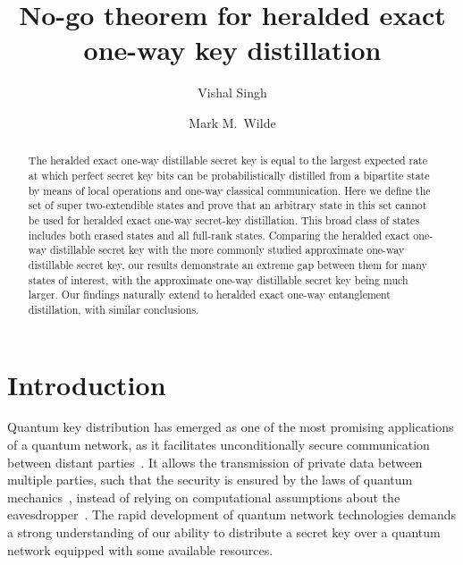 \documentclass[twocolumn,letterpaper, dvipsnames,allowtoday, accepted = 2025-12-31]{quantumarticle}
\begin{document}
\title[ ]{No-go theorem for heralded exact one-way  key distillation}

\author{Vishal Singh}
\author{Mark M.~Wilde}


\begin{abstract}
    The heralded exact one-way distillable secret key is equal to the largest expected rate at which perfect secret key bits can be probabilistically distilled from a bipartite state by means of local operations and one-way classical communication. Here we define the set of super two-extendible states and prove that an arbitrary  state in this set  cannot be used for heralded exact one-way secret-key distillation. This broad class of states includes both erased states and all full-rank states. Comparing the heralded exact one-way distillable secret key with the more commonly studied approximate one-way distillable secret key, our results demonstrate an extreme gap between them for many states of interest, with the approximate one-way distillable secret key being much larger. Our findings naturally extend to heralded exact one-way entanglement distillation, with similar conclusions. 
\end{abstract}
\maketitle

\section{Introduction}

Quantum key distribution has emerged as one of the most promising applications of a quantum network, as it facilitates unconditionally secure communication between distant parties~\cite{RevModPhys.92.025002,RevModPhys.94.025008,zapatero2023advances}. It allows the transmission of private data between multiple parties, such that the security is ensured by the laws of quantum mechanics~\cite{BB84, Bennett2014, Ekert91}, instead of relying on  computational assumptions about the eavesdropper~\cite{katz2007introduction}. The rapid development of quantum network technologies demands a strong understanding of our ability to distribute a secret key over a quantum network equipped with some available resources. 
\end{document}
